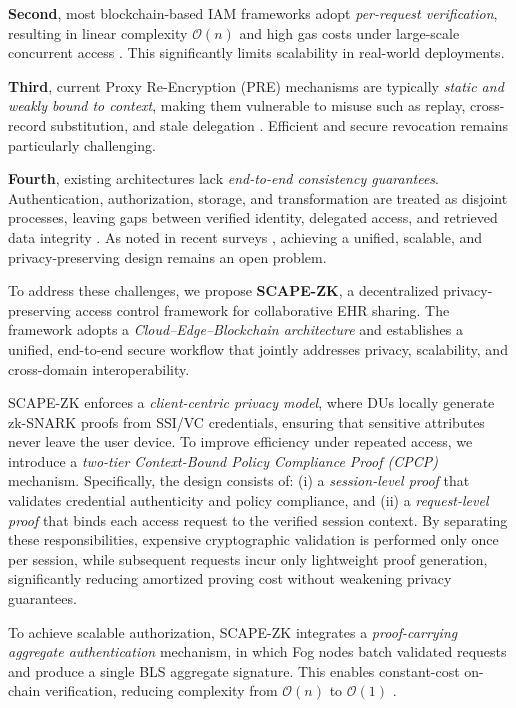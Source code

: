 \documentclass[conference]{IEEEtran}
\begin{document}
\textbf{Second}, most blockchain-based IAM frameworks adopt \emph{per-request verification}, resulting in linear complexity $\mathcal{O}(n)$ and high gas costs under large-scale concurrent access \cite{b15}. This significantly limits scalability in real-world deployments.

\textbf{Third}, current Proxy Re-Encryption (PRE) mechanisms are typically \emph{static and weakly bound to context}, making them vulnerable to misuse such as replay, cross-record substitution, and stale delegation \cite{b12}. Efficient and secure revocation remains particularly challenging.

\textbf{Fourth}, existing architectures lack \emph{end-to-end consistency guarantees}. Authentication, authorization, storage, and transformation are treated as disjoint processes, leaving gaps between verified identity, delegated access, and retrieved data integrity \cite{b16}. As noted in recent surveys \cite{b17}, achieving a unified, scalable, and privacy-preserving design remains an open problem.


To address these challenges, we propose \textbf{SCAPE-ZK}, a decentralized privacy-preserving access control framework for collaborative EHR sharing. The framework adopts a \emph{Cloud--Edge--Blockchain architecture} and establishes a unified, end-to-end secure workflow that jointly addresses privacy, scalability, and cross-domain interoperability.

SCAPE-ZK enforces a \emph{client-centric privacy model}, where DUs locally generate zk-SNARK proofs from SSI/VC credentials, ensuring that sensitive attributes never leave the user device. To improve efficiency under repeated access, we introduce a \emph{two-tier Context-Bound Policy Compliance Proof (CPCP)} mechanism. Specifically, the design consists of: (i) a \emph{session-level proof} that validates credential authenticity and policy compliance, and (ii) a \emph{request-level proof} that binds each access request to the verified session context. By separating these responsibilities, expensive cryptographic validation is performed only once per session, while subsequent requests incur only lightweight proof generation, significantly reducing amortized proving cost without weakening privacy guarantees.

To achieve scalable authorization, SCAPE-ZK integrates a \emph{proof-carrying aggregate authentication} mechanism, in which Fog nodes batch validated requests and produce a single BLS aggregate signature. This enables constant-cost on-chain verification, reducing complexity from $\mathcal{O}(n)$ to $\mathcal{O}(1)$ \cite{b9,b10,b15}.
\end{document}
